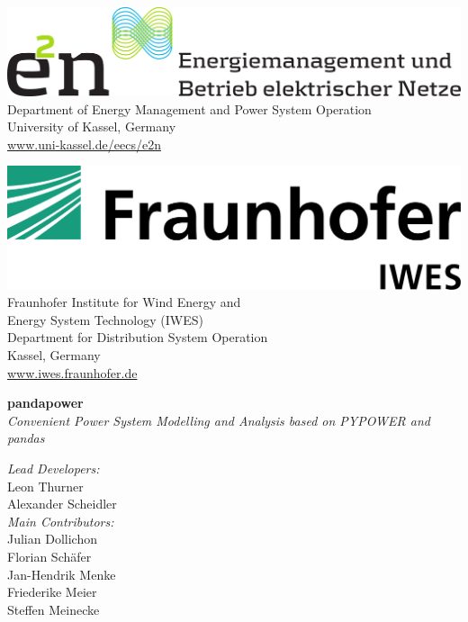 \begin{titlepage}
\vspace*{1cm} 

\center
\begin{minipage}[t]{0.45\textwidth}
\includegraphics[width=1\textwidth]{../report/e2n.png}\\[1.5em]
Department of Energy Management and Power System Operation \\[0.5em]
University of Kassel, Germany \\[0.5em]
\href{url}{www.uni-kassel.de/eecs/e2n}
\end{minipage}\hfill
\begin{minipage}[t]{0.45\textwidth}
\includegraphics[width=.75\textwidth]{../report/IWES.png} \\[1em]
Fraunhofer Institute for Wind Energy and \\ Energy System Technology (IWES) \\[0.5em]
Department for Distribution System Operation \\[0.5em]
Kassel, Germany \\[0.5em]
\href{url}{www.iwes.fraunhofer.de}
\end{minipage}



\vfill
\large
\flushleft
\begin{minipage}{0.5\textwidth}
\textbf{pandapower}\\[0.5em]
\textit{Convenient Power System Modelling and Analysis based on PYPOWER and pandas}\\[2em]
\end{minipage}

\textit{Lead Developers:}\\
Leon Thurner \\
Alexander Scheidler\\[1em]

\textit{Main Contributors:} \\
Julian Dollichon\\
Florian Schäfer \\
Jan-Hendrik Menke \\
Friederike Meier\\
Steffen Meinecke\\[1em]


\end{titlepage}
